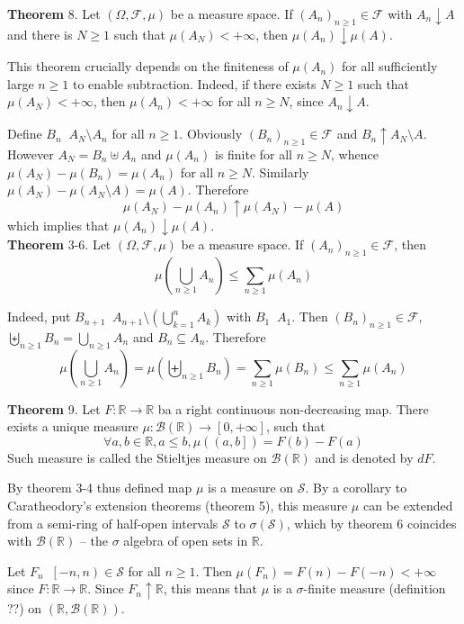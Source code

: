 \documentclass[a4paper]{article}
\newcommand{\clo}[1]{\left [ #1 \right ]}
\newcommand{\clop}[1]{\left [ #1 \right )}
\newcommand{\ploc}[1]{\left ( #1 \right ]}
\newcommand{\brac}[1]{\left ( #1 \right )}
\newcommand{\Real}{\mathbb{R}}
\newcommand{\Zinf}{\clo{ 0, +\infty }}
\newcommand{\Scal}{\mathcal{S}}
\newcommand{\Fcal}{\mathcal{F}}
\newcommand{\borel}[1]{\mathcal{B}\brac{#1}}
\newcommand{\defn}{\mathop{\overset{\Delta}{=}}\nolimits}
\begin{document}
\label{thm:meas_cont_down} \noindent \textbf{Theorem} 8.
Let $\brac{\Omega, \Fcal, \mu}$ be a measure space. If $\brac{A_n}_{n\geq 1}\in \Fcal$ with $A_n\downarrow A$ and there is $N\geq 1$ such that $\mu\brac{A_N}<+\infty$, then $\mu\brac{A_n}\downarrow\mu\brac{A}$.

This theorem crucially depends on the finiteness of $\mu\brac{A_n}$ for all sufficiently large $n\geq 1$ to enable subtraction. Indeed, if there exists $N\geq1$ such that $\mu\brac{A_N}<+\infty$, then $\mu\brac{A_n}<+\infty$ for all $n\geq N$, since $A_n\downarrow A$.

Define $B_n\defn A_N\setminus A_n$ for all $n\geq1$. Obviously $\brac{B_n}_{n\geq1}\in \Fcal$ and $B_n\uparrow A_N\setminus A$. However $A_N=B_n\uplus A_n$ and $\mu\brac{A_n}$ is finite for all $n\geq N$, whence $\mu\brac{A_N}-\mu\brac{B_n}=\mu\brac{A_n}$ for all $n\geq N$. Similarly $\mu\brac{A_N}-\mu\brac{A_N\setminus A} = \mu\brac{A}$. Therefore \[\mu\brac{A_N}-\mu\brac{A_n}\uparrow \mu\brac{A_N}-\mu\brac{A}\] which implies that $\mu\brac{A_n}\downarrow \mu\brac{A}$.\\

\label{thm:meas_subadd} \noindent \textbf{Theorem} 3-6.
Let $\brac{\Omega, \Fcal, \mu}$ be a measure space. If $\brac{A_n}_{n\geq1}\in \Fcal$, then \[\mu\brac{\bigcup_{n\geq1} A_n}\leq \sum_{n\geq1} \mu\brac{A_n}\]

Indeed, put $B_{n+1}\defn A_{n+1}\setminus\brac{ \bigcup_{k=1}^n A_k}$ with $B_1\defn A_1$. Then $\brac{B_n}_{n\geq1}\in \Fcal$, $\biguplus_{n\geq1} B_n = \bigcup_{n\geq1} A_n$ and $B_n\subseteq A_n$. Therefore \[\mu\brac{\bigcup_{n\geq1} A_n} = \mu\brac{\biguplus_{n\geq1} B_n} = \sum_{n\geq1} \mu\brac{B_n}\leq \sum_{n\geq1} \mu\brac{A_n}\]

\label{thm:stieltjes_meas} \noindent \textbf{Theorem} 9.
Let $F:\Real\to\Real$ ba a right continuous non-decreasing map. There exists a unique measure $\mu:\borel{\Real}\to \Zinf$, such that \[\forall a, b\in \Real, a\leq b, \mu\brac{\ploc{a, b}} = F\brac{b} - F\brac{a}\] Such measure is called the Stieltjes measure on $\borel{\Real}$ and is denoted by $dF$.

By theorem 3-4 thus defined map $\mu$ is a measure on $\Scal$. By a corollary to Caratheodory's extension theorems (theorem 5), this measure $\mu$ can be extended from a semi-ring of half-open intervals $\Scal$ to $\sigma\brac{\Scal}$, which by theorem 6 coincides with $\borel{\Real}$ -- the $\sigma$ algebra of open sets in $\Real$.

Let $F_n\defn \clop{-n,n}\in \Scal$ for all $n\geq1$. Then $\mu\brac{F_n}=F\brac{n}-F\brac{-n}<+\infty$ since $F:\Real\to\Real$. Since $F_n\uparrow \Real$, this means that $\mu$ is a $\sigma$-finite measure (definition ??) on $\brac{\Real,\borel{\Real}}$.
\end{document}
